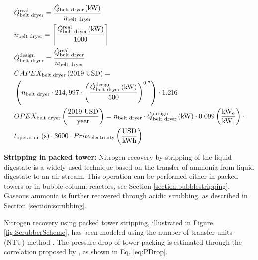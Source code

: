 \begin{refsection}[referencesCh6]
\begin{align}
& \dot{Q}_{\text{belt dryer}}^{\text{real}} = \frac{\dot{Q}_{\text{belt dryer}}\left(\text{kW}\right)}{\eta_{\text{belt dryer}}} \label{eq:QeltDryerReal} 
\\
& n_{\text{belt dryer}} = \ceil*{\frac{\dot{Q}_{\text{belt dryer}}^{\text{real}}\left(\text{kW}\right)}{1000}} \label{eq:nBeltDryer} 
\\
& \dot{Q}_{\text{belt dryer}}^{\text{design}} = \frac{\dot{Q}_{\text{belt dryer}}^{\text{real}}}{n_{\text{belt dryer}}} \label{eq:QeltDryerDesign} 
\\
& CAPEX_{\text{belt dryer}} \left(\text{2019 USD}\right) = \nonumber \\
& \left(n_{\text{belt dryer}} \cdot 214,997 \cdot \left(\frac{\dot{Q}_{\text{belt dryer}}^{\text{design}}\left(\text{kW}\right)}{500}\right)^{0.7}\right) \cdot 1.216 \label{eq:CAPEXBeltDryer} 
\\
& OPEX_{\text{belt dryer}} \left(\frac{\text{2019 USD}}{\text{year}}\right) = n_{\text{belt dryer}} \cdot \dot{Q}_{\text{belt dryer}}^{\text{design}} \left(\text{kW}\right) \cdot 0.099 \left(\frac{\text{kW}_{\text{e}}}{\text{kW}_{\text{t}}}\right) \cdot \label{eq:BeltDryerOPEX}
\\ 
& t_{\text{operation}} \left(\text{s}\right) \cdot 3600 \cdot Price_{\text{electricity}} \left(\frac{\text{USD}}{\text{kWh}}\right)  \nonumber
\end{align}

\textbf{Stripping in packed tower:} Nitrogen recovery by stripping of the liquid digestate is a widely used technique based on the transfer of ammonia from liquid digestate to an air stream. This operation can be performed either in packed towers or in bubble column reactors, see Section \ref{section:bubblestripping}. Gaseous ammonia is further recovered through acidic scrubbing, as described in Section \ref{section:scrubbing}.

Nitrogen recovery using packed tower stripping, illustrated in Figure \ref{fig:ScrubberScheme}, has been modeled using the number of transfer units (NTU) method \citep{Metcalf}. The pressure drop of tower packing is estimated through the correlation proposed by \citet{kister1991predict}, as shown in Eq. \ref{eq:PDrop}. 


\end{refsection}
